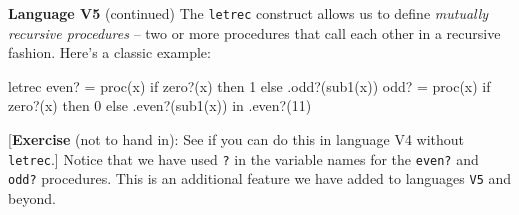 \begin{minipage}[t]{\sw}
\slidenumber
\LARGE
{\bf Language V5} (continued)\exx
The \verb'letrec' construct allows us
to define {\em mutually recursive procedures} --
two or more procedures that call each other in a recursive fashion.
Here's a classic example:
\begin{qv}
letrec
  even? = proc(x) if zero?(x) then 1 else .odd?(sub1(x))
  odd? = proc(x) if zero?(x) then 0 else .even?(sub1(x))
in
  .even?(11) %
\end{qv}
[{\bf Exercise} (not to hand in): See if you can do this in language V4
without \verb'letrec'.]\exx
Notice that we have used \verb'?'
in the variable names for the \verb'even?' and \verb'odd?' procedures.
This is an additional feature we have added
to languages \verb'V5' and beyond.

\end{minipage}
